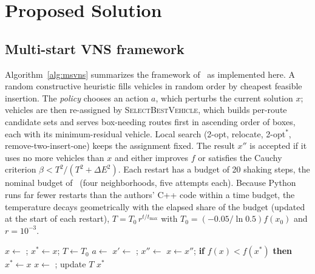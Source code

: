 \documentclass[conference]{IEEEtran}
\begin{document}
\section{Proposed Solution}
\subsection{Multi-start VNS framework}
Algorithm~\ref{alg:msvns} summarizes the framework of~\cite{masmoudi2026,mladenovic1997} as implemented here. A random constructive heuristic fills vehicles in random order by cheapest feasible insertion. The \emph{policy} chooses an action $a$, which perturbs the current solution $x$; vehicles are then re-assigned by \textsc{SelectBestVehicle}, which builds per-route candidate sets and serves box-needing routes first in ascending order of boxes, each with its minimum-residual vehicle. Local search (2-opt, relocate, 2-opt$^*$, remove-two-insert-one) keeps the assignment fixed. The result $x''$ is accepted if it uses no more vehicles than $x$ and either improves $f$ or satisfies the Cauchy criterion $\beta<T^2/(T^2+\Delta E^2)$. Each restart has a budget of 20 shaking steps, the nominal budget of~\cite{masmoudi2026} (four neighborhoods, five attempts each). Because Python runs far fewer restarts than the authors' C++ code within a time budget, the temperature decays geometrically with the elapsed share of the budget (updated at the start of each restart), $T=T_0\,r^{t/t_{\max}}$ with $T_0=(-0.05/\ln 0.5)f(x_0)$ and $r=10^{-3}$.

\begin{algorithm}[t]
\caption{Multi-start VNS with a selection policy}\label{alg:msvns}
\begin{algorithmic}[1]
\State $x\gets$ ; $x^*\gets x$; $T\gets T_0$
    \State $a\gets$ 
    \State $x'\gets$ ; 
    \State $x''\gets$ 
      \State $x\gets x''$; \textbf{if} $f(x)<f(x^*)$ \textbf{then} $x^*\gets x$
    \EndIf
    \State {}
  \EndFor
  \State $x\gets$ ; update $T$ 
\EndWhile
\State \Return $x^*$
\end{algorithmic}
\end{algorithm}
\end{document}
